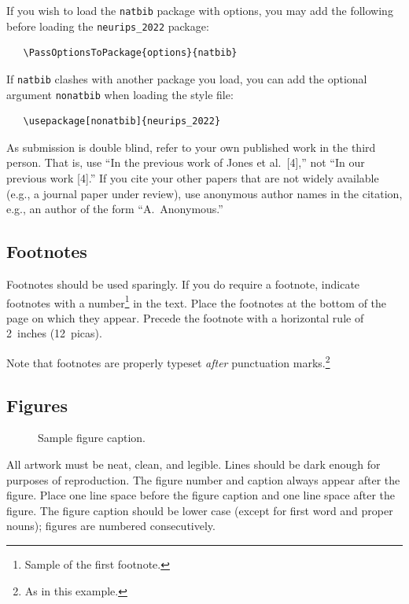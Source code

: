\documentclass{article}
\begin{document}
If you wish to load the \verb+natbib+ package with options, you may add the
following before loading the \verb+neurips_2022+ package:
\begin{verbatim}
   \PassOptionsToPackage{options}{natbib}
\end{verbatim}


If \verb+natbib+ clashes with another package you load, you can add the optional
argument \verb+nonatbib+ when loading the style file:
\begin{verbatim}
   \usepackage[nonatbib]{neurips_2022}
\end{verbatim}


As submission is double blind, refer to your own published work in the third
person. That is, use ``In the previous work of Jones et al.\ [4],'' not ``In our
previous work [4].'' If you cite your other papers that are not widely available
(e.g., a journal paper under review), use anonymous author names in the
citation, e.g., an author of the form ``A.\ Anonymous.''


\subsection{Footnotes}


Footnotes should be used sparingly.  If you do require a footnote, indicate
footnotes with a number\footnote{Sample of the first footnote.} in the
text. Place the footnotes at the bottom of the page on which they appear.
Precede the footnote with a horizontal rule of 2~inches (12~picas).


Note that footnotes are properly typeset \emph{after} punctuation
marks.\footnote{As in this example.}


\subsection{Figures}


\begin{figure}
  \centering
  \fbox{\rule[-.5cm]{0cm}{4cm} \rule[-.5cm]{4cm}{0cm}}
  \caption{Sample figure caption.}
\end{figure}


All artwork must be neat, clean, and legible. Lines should be dark enough for
purposes of reproduction. The figure number and caption always appear after the
figure. Place one line space before the figure caption and one line space after
the figure. The figure caption should be lower case (except for first word and
proper nouns); figures are numbered consecutively.
\end{document}
